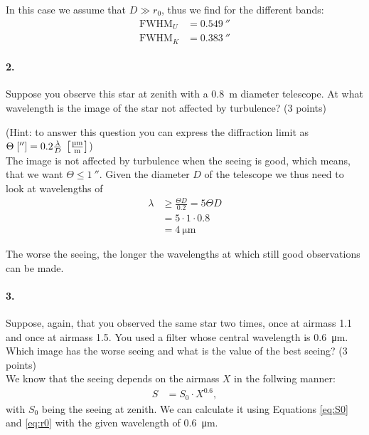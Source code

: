 \documentclass[11pt,a4paper,twoside]{article}
\begin{document}
In this case we assume that $D \gg r_0$, thus we find for the different bands:
\begin{align}
    \mathrm{FWHM}_U &= \SI{0.549}{\arcsecond}   \\
    \mathrm{FWHM}_K &= \SI{0.383}{\arcsecond}
\end{align}

\paragraph{2.} Suppose you observe this star at zenith with a \SI{0.8}{\meter}
diameter telescope. At what wavelength is the image of the star not affected by
turbulence? (3 points) 

(Hint: to answer this question you can express the diffraction limit as
$\Theta\;[\si{\arcsecond}] = 0.2\frac{\lambda}{D} \;
\left[\si[per-mode=fraction]{\micro\meter\per\meter}\right]$) \\

The image is not affected by turbulence when the seeing is good, which means,
that we want $\Theta \leq \SI{1}{\arcsecond}$. Given the diameter $D$ of the 
telescope we thus need to look at wavelengths of
\begin{align}
\lambda &\geq \frac{\Theta D}{0.2} = 5\Theta D\\
        &= 5\cdot 1 \cdot 0.8 \\
        &= \SI{4}{\micro\meter}
\end{align}

The worse the seeing, the longer the wavelengths at which still good
observations can be made. \\


\paragraph{3.} Suppose, again, that you observed the same star two times, once
at airmass 1.1 and once at airmass \num{1.5}. You used a filter whose central
wavelength is \SI{0.6}{\micro\meter}.  Which image has the worse seeing and
what is the value of the best seeing?  (3 points) \\

We know that the seeing depends on the airmass $X$ in the follwing manner:
\begin{align}
S &= S_0 \cdot X^{0.6},
\end{align}
with $S_0$ being the seeing at zenith. We can calculate it using Equations
\ref{eq:S0} and \ref{eq:r0} with the given wavelength of \SI{0.6}{\micro\meter}.
\end{document}
